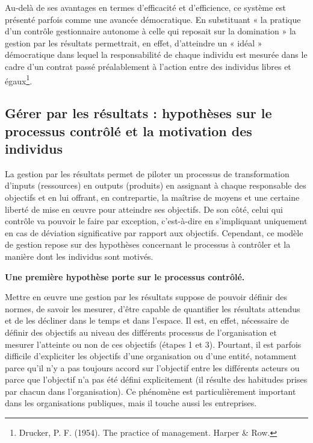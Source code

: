 \documentclass[oneside]{kaobook}
\begin{document}
Au-delà de ses avantages en termes d’efficacité et d’efficience, ce système est présenté parfois comme une avancée démocratique. En substituant « la pratique d’un contrôle gestionnaire autonome à celle qui reposait sur la domination » la gestion par les résultats permettrait, en effet, d’atteindre un « idéal » démocratique dans lequel la responsabilité de chaque individu est mesurée dans le cadre d’un contrat passé préalablement à l’action entre des individus libres et égaux\footnote{Drucker, P. F. (1954). The practice of management. Harper \& Row.}. 
\subsection{Gérer par les résultats : hypothèses sur le processus contrôlé et la motivation des individus}
\label{sec:orgc101d63}
La gestion par les résultats permet de piloter un processus de transformation d’inputs (ressources) en outputs (produits) en assignant à chaque responsable des objectifs et en lui offrant, en contrepartie, la maîtrise de moyens et une certaine liberté de mise en œuvre pour atteindre ses objectifs. De son côté, celui qui contrôle va pouvoir le faire par exception, c’est-à-dire en s’impliquant uniquement en cas de déviation significative par rapport aux objectifs. Cependant, ce modèle de gestion repose sur des hypothèses concernant le processus à contrôler et la manière dont les individus sont motivés.

\textbf{Une première hypothèse porte sur le processus contrôlé.}

Mettre en œuvre une gestion par les résultats suppose de pouvoir définir des normes, de savoir les mesurer, d’être capable de quantifier les résultats attendus et de les décliner dans le temps et dans l’espace. Il est, en effet, nécessaire de définir des objectifs au niveau des différents processus de l’organisation et mesurer l’atteinte ou non de ces objectifs (étapes 1 et 3). Pourtant, il est parfois difficile d’expliciter les objectifs d’une organisation ou d’une entité, notamment parce qu’il n’y a pas toujours accord sur l’objectif entre les différents acteurs ou parce que l’objectif n’a pas été défini explicitement (il résulte des habitudes prises par chacun dans l’organisation). Ce phénomène est particulièrement important dans les organisations publiques, mais il touche aussi les entreprises.
\end{document}
